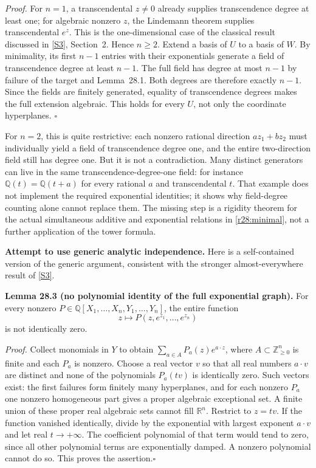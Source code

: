 \documentclass[11pt,a4paper]{article}
\newcommand{\Z}{\mathbb{Z}}
\newcommand{\Q}{\mathbb{Q}}
\newcommand{\R}{\mathbb{R}}
\newcommand{\sref}[2]{\hyperlink{source:#1:#2}{[S#2]}}
\numberwithin{equation}{section}
\begin{document}
\emph{Proof.} For $n=1$, a transcendental $z\ne0$ already supplies
transcendence degree at least one; for algebraic nonzero $z$, the
Lindemann theorem supplies transcendental $e^z$. This is the
one-dimensional case of the classical result discussed in
\sref{28}{3}, Section~2. Hence $n\ge2$. Extend a basis of $U$ to a basis
of $W$. By minimality, its first $n-1$ entries with their exponentials
generate a field of transcendence degree at least $n-1$. The full field
has degree at most $n-1$ by failure of the target and Lemma~28.1. Both
degrees are therefore exactly $n-1$. Since the fields are finitely
generated, equality of transcendence degrees makes the full extension
algebraic. This holds for every $U$, not only the coordinate hyperplanes.
\hfill$\square$

For $n=2$, this is quite restrictive: each nonzero rational direction
$az_1+bz_2$ must individually yield a field of transcendence degree one,
and the entire two-direction field still has degree one. But it is not
a contradiction. Many distinct generators can live in the same
transcendence-degree-one field: for instance $\Q(t)=\Q(t+a)$ for every
rational $a$ and transcendental $t$. That example does not implement the
required exponential identities; it shows why field-degree counting alone
cannot replace them. The missing step is a rigidity theorem for the
actual simultaneous additive and exponential relations in
\eqref{r28:minimal}, not a further application of the tower formula.

\medskip
\textbf{Attempt to use generic analytic independence.}
Here is a self-contained version of the generic argument, consistent
with the stronger almost-everywhere result of \sref{28}{3}.

\textbf{Lemma 28.3 (no polynomial identity of the full exponential graph).}
For every nonzero $P\in\Q[X_1,\ldots,X_n,Y_1,\ldots,Y_n]$, the entire
function
\[
                    z\longmapsto P(z,e^{z_1},\ldots,e^{z_n})
\]
is not identically zero.

\emph{Proof.} Collect monomials in $Y$ to obtain
$\sum_{a\in A}P_a(z)e^{a\cdot z}$, where $A\subset\Z_{\ge0}^n$ is finite
and each $P_a$ is nonzero. Choose a real vector $v$ so that all real
numbers $a\cdot v$ are distinct and none of the polynomials $P_a(tv)$
is identically zero. Such vectors exist: the first failures form finitely
many hyperplanes, and for each nonzero $P_a$ one nonzero homogeneous
part gives a proper algebraic exceptional set. A finite union of these
proper real algebraic sets cannot fill $\R^n$.
Restrict to $z=tv$. If the function vanished identically, divide by the
exponential with largest exponent $a\cdot v$ and let real $t\to+\infty$.
The coefficient polynomial of that term would tend to zero, since all
other polynomial terms are exponentially damped. A nonzero polynomial
cannot do so. This proves the assertion.\hfill$\square$
\end{document}
